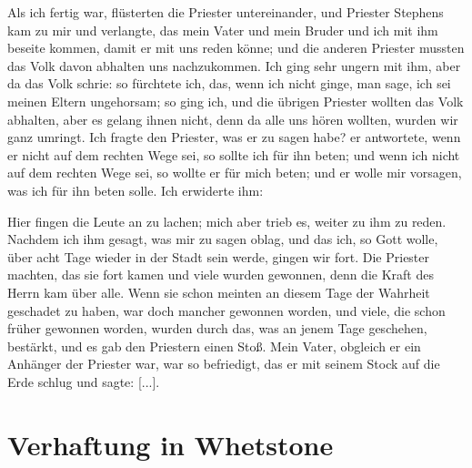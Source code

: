 Als ich fertig war, flüsterten
die Priester untereinander, und Priester Stephens kam zu mir
und verlangte, das mein Vater und mein Bruder und ich mit
ihm beseite kommen, damit er mit uns reden könne; und die
anderen Priester mussten das Volk davon abhalten uns 
nachzukommen. Ich ging sehr ungern mit ihm, aber da das Volk schrie:
 so fürchtete ich, das, wenn ich nicht
ginge, man sage, ich sei meinen Eltern ungehorsam; so ging ich,
und die übrigen Priester wollten das Volk abhalten, aber es
gelang ihnen nicht, denn da alle uns hören wollten, wurden wir
ganz umringt. Ich fragte den Priester, was er zu sagen habe?
er antwortete, wenn er nicht auf dem rechten Wege sei, so sollte
ich für ihn beten; und wenn ich nicht auf dem rechten Wege sei,
so wollte er für mich beten; und er wolle mir vorsagen, was ich
für ihn beten solle. Ich erwiderte ihm: 


Hier fingen die Leute an zu lachen; mich aber trieb
es, weiter zu ihm zu reden. Nachdem ich ihm gesagt, was
mir zu sagen oblag, und das ich, so Gott wolle, über acht Tage wieder
in der Stadt sein werde, gingen wir fort. Die Priester machten,
das sie fort kamen und viele wurden gewonnen, denn die Kraft des
Herrn kam über alle. Wenn sie schon meinten an diesem Tage
der Wahrheit geschadet zu haben, war doch mancher gewonnen
worden, und viele, die schon früher gewonnen worden, wurden durch
das, was an jenem Tage geschehen, bestärkt, und es gab den
Priestern einen Stoß. Mein Vater, obgleich er ein Anhänger der
Priester war, war so befriedigt, das er mit seinem Stock auf die
Erde schlug und sagte: 
 [...].

\section{Verhaftung in Whetstone}


